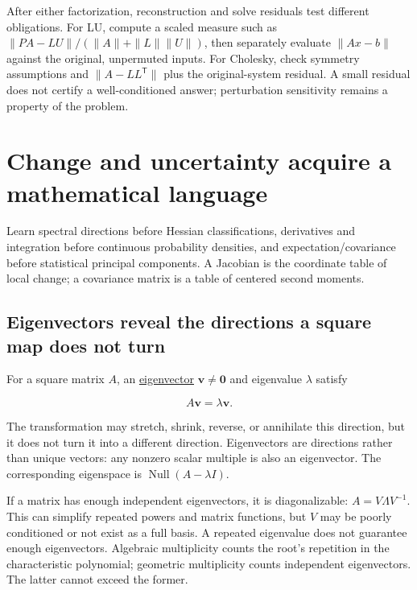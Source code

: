 After either factorization, reconstruction and solve residuals test different obligations. For LU, compute a scaled measure such as \(\|PA-LU\|/(\|A\|+\|L\|\|U\|)\), then separately evaluate \(\|Ax-b\|\) against the original, unpermuted inputs. For Cholesky, check symmetry assumptions and \(\|A-LL^\mathsf T\|\) plus the original-system residual. A small residual does not certify a well-conditioned answer; perturbation sensitivity remains a property of the problem.

\section{Change and uncertainty acquire a mathematical language}\label{01-foundations-i-ch020-change-and-uncertainty-acquire-a-mathematical-language}

\hypertarget{01-foundations-i-ch020-change-and-uncertainty-acquire-a-mathematical-language}{}

Learn spectral directions before Hessian classifications, derivatives and integration before continuous probability densities, and expectation/covariance before statistical principal components. A Jacobian is the coordinate table of local change; a covariance matrix is a table of centered second moments.

\subsection{Eigenvectors reveal the directions a square map does not turn}\label{01-foundations-i-ch020-eigenvectors-reveal-the-directions-a-square-map-does-not-turn}

\hypertarget{01-foundations-i-ch020-eigenvectors-reveal-the-directions-a-square-map-does-not-turn}{}

For a square matrix \(A\), an \hyperref[01-foundations-i-ch020-eigenvalues-eigenspaces-and-the-two-kinds-of-multiplicity]{eigenvector} \(\mathbf v\ne\mathbf0\) and eigenvalue \(\lambda\) satisfy

\[
A\mathbf v=\lambda\mathbf v.
\]

The transformation may stretch, shrink, reverse, or annihilate this direction, but it does not turn it into a different direction. Eigenvectors are directions rather than unique vectors: any nonzero scalar multiple is also an eigenvector. The corresponding eigenspace is \(\operatorname{Null}(A-\lambda I)\).

If a matrix has enough independent eigenvectors, it is diagonalizable: \(A=V\Lambda V^{-1}\). This can simplify repeated powers and matrix functions, but \(V\) may be poorly conditioned or not exist as a full basis. A repeated eigenvalue does not guarantee enough eigenvectors. Algebraic multiplicity counts the root's repetition in the characteristic polynomial; geometric multiplicity counts independent eigenvectors. The latter cannot exceed the former.

